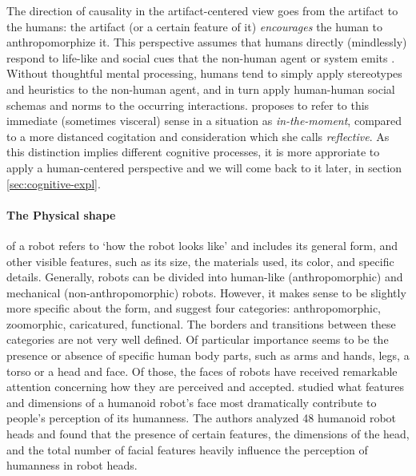 \documentclass{frontiersSCNS} %
\begin{document}
The direction of causality in the artifact-centered view goes from the artifact
to the humans: the artifact (or a certain feature of it) \emph{encourages} the
human to anthropomorphize it.  This perspective assumes that humans directly
(mindlessly) respond to life-like and social cues that the non-human agent or
system emits \citep{nass_machines_2000}. Without thoughtful mental processing,
humans tend to simply apply stereotypes and heuristics to the non-human agent,
and in turn apply human-human social schemas and norms to the occurring
interactions.  \cite{takayama_perspectives_2012} proposes to refer to this
immediate (sometimes visceral) sense in a situation as \textit{in-the-moment},
compared to a more distanced cogitation and consideration which she calls
\textit{reflective}. As this distinction implies different cognitive processes,
it is more approriate to apply a human-centered perspective and we will come
back to it later, in section \ref{sec:cognitive-expl}.


\paragraph{The Physical shape} of a robot refers to `how the robot looks like'
and includes its general form, and other visible features, such as its size, the
materials used, its color, and specific details. Generally, robots can be
divided into human-like (anthropomorphic) and mechanical (non-anthropomorphic)
robots. However, it makes sense to be slightly more specific about the form, and
\cite{fong_survey_2003} suggest four categories: anthropomorphic, zoomorphic,
caricatured, functional. The borders and transitions between these categories
are not very well defined.  Of particular importance seems to be the presence or
absence of specific human body parts, such as arms and hands, legs, a torso or a
head and face. Of those, the faces of robots have received remarkable attention
concerning how they are perceived and accepted. \cite{disalvo_all_2002} studied
what features and dimensions of a humanoid robot's face most dramatically
contribute to people's perception of its humanness. The authors analyzed 48
humanoid robot heads and found that the presence of certain features, the
dimensions of the head, and the total number of facial features heavily
influence the perception of humanness in robot heads. 
\end{document}
